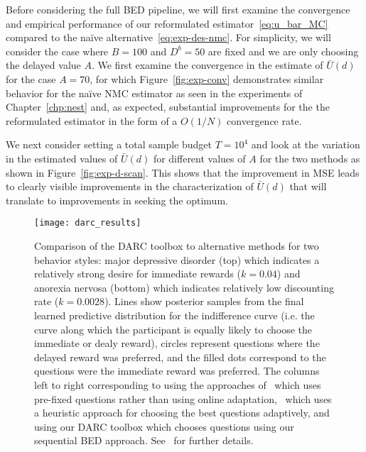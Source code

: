 Before considering the full BED pipeline, we will first examine the convergence and empirical
performance of our
reformulated estimator~\eqref{eq:u_bar_MC}  compared to the na\"{i}ve alternative~\eqref{eq:exp-des-nmc}.
For simplicity, we will consider the case 
where $B=100$ and $D^b = 50$ are fixed and we are only choosing the delayed value $A$.
We first examine the convergence in the estimate of $\bar{U}(d)$ for the case $A=70$,
for which Figure~\ref{fig:exp-conv} demonstrates similar behavior for the na\"{i}ve NMC estimator
as seen in the experiments of Chapter~\ref{chp:nest} and, as expected, substantial improvements
for the the reformulated estimator in the form of a $O(1/N)$ convergence rate.

We next consider setting a total sample budget $T=10^4$ and look at the variation in the 
estimated values of $\bar{U}(d)$ for different values of $A$ for the two methods as 
shown in Figure~\ref{fig:exp-d-scan}. This shows that the improvement in MSE leads 
to clearly visible improvements in the characterization of $\bar{U}(d)$ that
will translate to improvements in seeking the optimum.

\begin{figure}[t]
	\centering
		\texttt{[image: darc\_results]}
	\caption{Comparison of the DARC toolbox to alternative methods for two behavior styles: major
		depressive disorder (top) which indicates a relatively strong desire for immediate rewards ($k=0.04$)
		and anorexia nervosa (bottom) which indicates relatively low discounting rate ($k=0.0028$).  Lines show
		posterior samples from the final learned predictive distribution for the indifference curve (i.e. the curve
		along which the participant is equally likely to choose the immediate or dealy reward), circles represent
		questions where the delayed reward was preferred, and the filled dots correspond to the questions were
		the immediate reward was preferred.  The columns left to right corresponding to using the approaches
		of~\cite{Kirby:2009eu} which uses pre-fixed questions rather than using online adaptation,~\cite{Frye:2016eu}
		which uses a heuristic approach for choosing the best questions adaptively, and using our DARC toolbox
		which chooses questions using our sequential BED approach.  See~\cite{vincent2017darc} for further details.
		\label{fig:design:darc}
	}
\end{figure}

